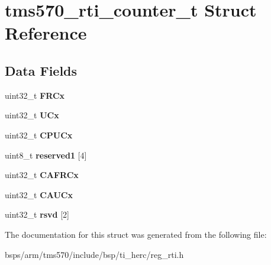 \hypertarget{structtms570__rti__counter__t}{}\section{tms570\+\_\+rti\+\_\+counter\+\_\+t Struct Reference}
\label{structtms570__rti__counter__t}
\subsection*{Data Fields}
\begin{DoxyCompactItemize}
\item 
\mbox{\label{structtms570__rti__counter__t_acedd3e168621a5dd0048db97ef6faeec}} 
uint32\+\_\+t {\bfseries F\+R\+Cx}
\item 
\mbox{\label{structtms570__rti__counter__t_a93409233f22043b296a20307ccabd49e}} 
uint32\+\_\+t {\bfseries U\+Cx}
\item 
\mbox{\label{structtms570__rti__counter__t_aefac32686832ed9373c0d96633166ad4}} 
uint32\+\_\+t {\bfseries C\+P\+U\+Cx}
\item 
\mbox{\label{structtms570__rti__counter__t_a3b0cb680892cc290bb6cab92c07be974}} 
uint8\+\_\+t {\bfseries reserved1} \mbox{[}4\mbox{]}
\item 
\mbox{\label{structtms570__rti__counter__t_ad9445cddd8daf31639f07ee8f736abe0}} 
uint32\+\_\+t {\bfseries C\+A\+F\+R\+Cx}
\item 
\mbox{\label{structtms570__rti__counter__t_a0e058f00650877cbb1d68d6b116e4781}} 
uint32\+\_\+t {\bfseries C\+A\+U\+Cx}
\item 
\mbox{\label{structtms570__rti__counter__t_a5aeafc65b7899d0b7e68d332db47c747}} 
uint32\+\_\+t {\bfseries rsvd} \mbox{[}2\mbox{]}
\end{DoxyCompactItemize}


The documentation for this struct was generated from the following file\+:\begin{DoxyCompactItemize}
\item 
bsps/arm/tms570/include/bsp/ti\+\_\+herc/reg\+\_\+rti.\+h\end{DoxyCompactItemize}
